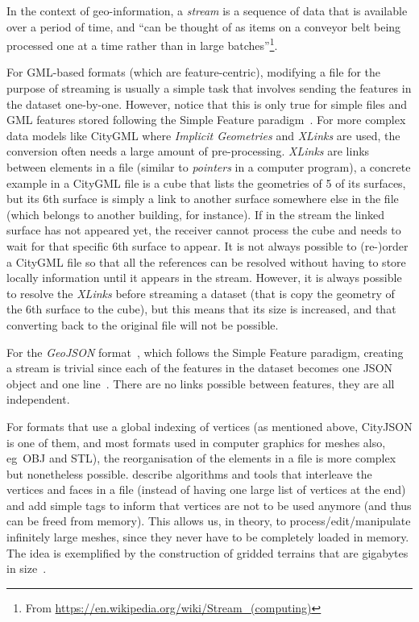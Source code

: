 \documentclass{isprs} %
\newcommand{\eg}{eg}
\begin{document}
In the context of geo-information, a \emph{stream} is a sequence of data that is available over a period of time, and ``can be thought of as items on a conveyor belt being processed one at a time rather than in large batches''\footnote{From \url{https://en.wikipedia.org/wiki/Stream_(computing)}}.

%

For GML-based formats (which are feature-centric), modifying a file for the purpose of streaming is usually a simple task that involves sending the features in the dataset one-by-one.
However, notice that this is only true for simple files and GML features stored following the Simple Feature paradigm~\citep{OGC-SF}.
For more complex data models like CityGML where \emph{Implicit Geometries} and \emph{XLinks} are used, the conversion often needs a large amount of pre-processing.
\emph{XLinks} are links between elements in a file (similar to \emph{pointers} in a computer program), a concrete example in a CityGML file is a cube that lists the geometries of 5 of its surfaces, but its 6th surface is simply a link to another surface somewhere else in the file (which belongs to another building, for instance).
If in the stream the linked surface has not appeared yet, the receiver cannot process the cube and needs to wait for that specific 6th surface to appear.
It is not always possible to (re-)order a CityGML file so that all the references can be resolved without having to store locally information until it appears in the stream.
However, it is always possible to resolve the \emph{XLinks} before streaming a dataset (that is copy the geometry of the 6th surface to the cube), but this means that its size is increased, and that converting back to the original file will not be possible.

%

For the \emph{GeoJSON} format~\citep{IETF-GeoJSON}, which follows the Simple Feature paradigm, creating a stream is trivial since each of the features in the dataset becomes one JSON object and one line~\citep{IETF-GeoJSONSeq}.
There are no links possible between features, they are all independent.

%

For formats that use a global indexing of vertices (as mentioned above, CityJSON is one of them, and  most formats used in computer graphics for meshes also, \eg\ OBJ and STL), the reorganisation of the elements in a file is more complex but nonetheless possible.
\citet{Isenburg03} describe algorithms and tools that interleave the vertices and faces in a file (instead of having one large list of vertices at the end) and add simple tags to inform that vertices are not to be used anymore (and thus can be freed from memory).
This allows us, in theory, to process/edit/manipulate infinitely large meshes, since they never have to be completely loaded in memory.
The idea is exemplified by the construction of gridded terrains that are gigabytes in size~\citep{Isenburg06-1}.
\end{document}
